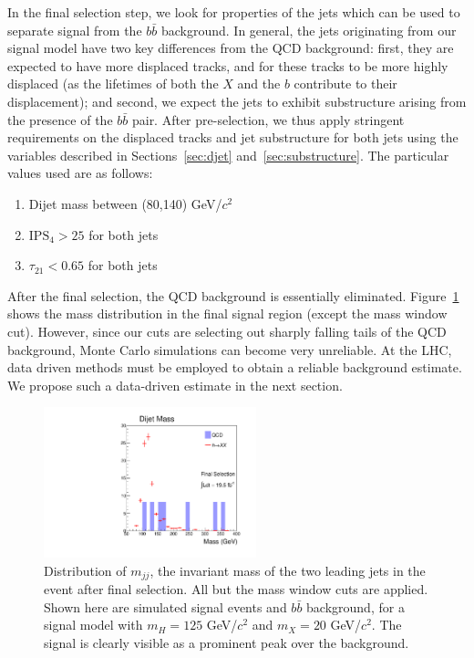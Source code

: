 \documentclass{JHEP3}
\newcommand{\IPS}{\textrm{IPS}}
\begin{document}
In the final selection step, we look for properties of the jets which can be used to separate signal
from the $b\bar{b}$ background. In general, the jets originating from our signal model have two key
differences from the QCD background: first, they are expected to have more displaced tracks, and for
these tracks to be more highly displaced (as the lifetimes of both the $X$ and the $b$ contribute to
their displacement); and second, we expect the jets to exhibit substructure arising from the presence of
the $b\bar{b}$ pair. After pre-selection, we thus apply stringent requirements on the displaced tracks
and jet substructure for both jets using the variables described in
Sections~\ref{sec:djet} and~\ref{sec:substructure}. The particular values used are as follows:

\begin{enumerate}
  \item Dijet mass between (80,140) GeV/$c^2$
  \item $\IPS_{4} > 25$ for both jets
  \item $\tau_{21} < 0.65$ for both jets
\end{enumerate}

After the final selection, the QCD background is essentially eliminated. Figure~\ref{fig:finalselection} shows the mass distribution in the final signal region (except the mass window cut). However, since our cuts are selecting out sharply falling tails of the QCD background, Monte Carlo simulations can become very unreliable. At the LHC, data driven methods must be employed to obtain a reliable background estimate. We propose such a data-driven estimate in the next section.

\begin{figure}[ht]
\centering
\includegraphics[width=0.55\textwidth]{mjj.pdf}
\caption{Distribution of $m_{jj}$, the invariant
  mass of the two leading jets in the event after final selection. All but the mass window cuts are applied. Shown here are
  simulated signal events and $b\bar{b}$ background, for a signal model with $m_H = 125$ GeV/$c^2$ and $m_X =
  20$ GeV/$c^2$. The signal is clearly visible as a prominent peak over the background.}
\label{fig:finalselection}
\end{figure}
\end{document}
